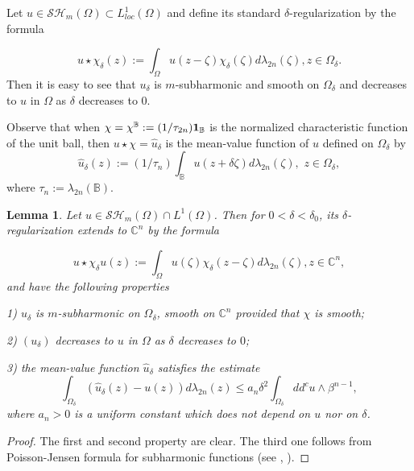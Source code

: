 \documentclass[12pt]{amsart}
\newtheorem{lemma}[theorem]{Lemma}
\theoremstyle{definition}
\numberwithin{theorem}{section}
\numberwithin{equation}{section}
\newcommand{\B}{\mathbb{B}}
\newcommand{\C}{\mathbb{C}}
\begin{document}
 Let $u \in \mathcal{SH}_m (\Omega) \subset L^1_{loc} (\Omega)$ and define its standard $\delta$-regularization by the formula
      
  \begin{equation} \label{eq:reg}
   u \star {\chi}_\delta  (z) := \int_{\Omega} u (z - \zeta) \chi_{\delta} (\zeta) d \lambda_{2n} (\zeta), z \in \Omega_{\delta}.
  \end{equation}
  Then it is easy to see that $ {u}_{\delta}$ is $m$-subharmonic and smooth on $\Omega_{\delta}$ and decreases to $u$ in $\Omega$ as $\delta $ decreases to $0$.
  
  Observe that when $\chi= \chi^\B  := (1/\tau_{2n})  {\bf 1}_\B$ is the normalized characteristic function of the unit ball, then $u \star \chi = \widehat{u}_\delta$ is the mean-value function of $u$  defined on $\Omega_\delta$  by
  $$
   \widehat{u}_\delta (z) := (1\slash \tau_n) \int_\B u (z +\delta \zeta) d \lambda_{2n} (\zeta), \, \, z \in \Omega_\delta,
  $$
where $\tau_n := \lambda_{2n} (\B)$.
\begin{lemma}   \label{lem:Poisson-Jensen}
Let $u \in \mathcal{SH}_m (\Omega) \cap L^{1} (\Omega)$. Then for $0 < \delta < \delta_0$, its $\delta$-regularization extends to $\C^n$ by the formula
      
  \begin{equation} \label{eq:reg}
 u \star  {\chi}_\delta u (z)  := \int_{\Omega} u (\zeta) \chi_{\delta} (z - \zeta) d \lambda_{2n} (\zeta), z \in \C^n,
  \end{equation}
and have the following properties
 
 1)  $ { u}_{\delta}$  is $m$-subharmonic on $\Omega_\delta$, smooth on $\C^n$ provided that $\chi$ is smooth;
 
     
 2) $({u}_\delta)$ decreases to $u$ in $\Omega$ as $\delta $ decreases to $0$; 
 
 
 3) the mean-value function $\widehat{u}_\delta $ satisfies the estimate
  $$
  \int_{\Omega_\delta} \left(\widehat{u}_\delta (z) - u(z)\right) d\lambda_{2 n}(z) \leq a_n \delta^2 \int_{\Omega_\delta} dd^c u \wedge \beta^{n - 1},
  $$ 
  where $a_n > 0$ is a uniform constant which does not depend on $u$ nor on $\delta$.


\end{lemma}
\begin{proof}
The first and second property are clear. The third one follows from Poisson-Jensen formula for subharmonic functions (see \cite{GKZ08}, \cite{Ze20}).
\end{proof}
\end{document}
